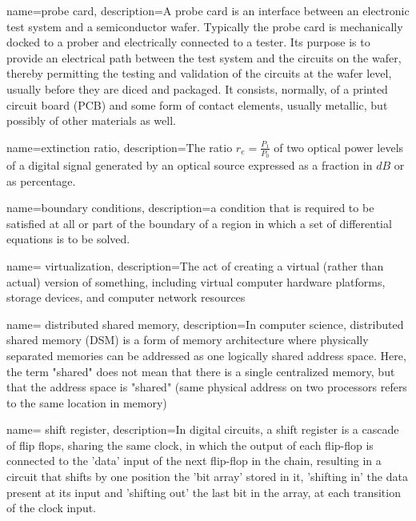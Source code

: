 {
        name=probe card,
        description={A probe card is an interface between an electronic test system and a semiconductor wafer. Typically the probe card is mechanically docked to a prober and electrically connected to a tester. Its purpose is to provide an electrical path between the test system and the circuits on the wafer, thereby permitting the testing and validation of the circuits at the wafer level, usually before they are diced and packaged. It consists, normally, of a printed circuit board (PCB) and some form of contact elements, usually metallic, but possibly of other materials as well.}
}

{
        name=extinction ratio,
        description={The ratio $r_e = \frac{P_1}{P_0}$ of two optical power levels of a digital signal generated by an optical source expressed as a fraction in $\si{dB}$ or as percentage.}
}

{
        name=boundary conditions,
        description={a condition that is required to be satisfied at all or part of the boundary of a region in which a set of differential equations is to be solved.}
}

{
        name= virtualization,
        description={The act of creating a virtual (rather than actual) version of something, including virtual computer hardware platforms, storage devices, and computer network resources}
}

{
        name= distributed shared memory,
        description={In computer science, distributed shared memory (DSM) is a form of memory architecture where physically separated memories can be addressed as one logically shared address space. Here, the term "shared" does not mean that there is a single centralized memory, but that the address space is "shared" (same physical address on two processors refers to the same location in memory)}
}

{
        name= shift register,
        description={In digital circuits, a shift register is a cascade of flip flops, sharing the same clock, in which the output of each flip-flop is connected to the 'data' input of the next flip-flop in the chain, resulting in a circuit that shifts by one position the 'bit array' stored in it, 'shifting in' the data present at its input and 'shifting out' the last bit in the array, at each transition of the clock input.}
}

